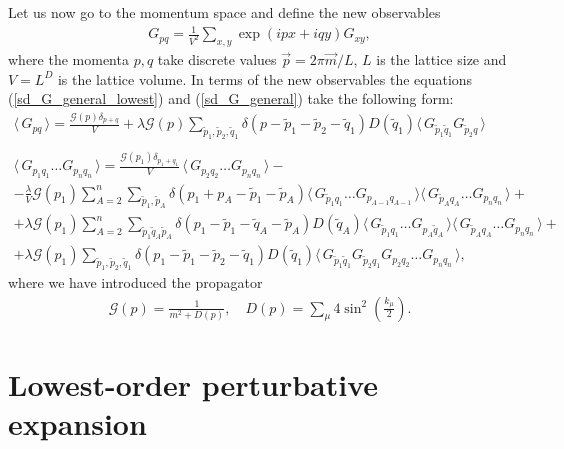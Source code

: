 \documentclass[twocolumn,showpacs,preprintnumbers,superscriptaddress,amsmath,floatfix,amssymb,secnumarabic]{revtex4}
\newcommand{\G}{\mathcal{G}}
\newcommand{\lr}[1]{ \left( #1 \right) }
\newcommand{\vev}[1]{ \langle \, #1 \, \rangle }
\newcommand{\expa}[1]{ \exp{\left( #1 \right)} }
\begin{document}
\begin{widetext}
Let us now go to the momentum space and define the new observables
\begin{eqnarray}
\label{momentum_space_observables}
 G_{p q} = \frac{1}{V^2} \sum\limits_{x, y} \expa{i p x + i q y} G_{x y},
\end{eqnarray}
where the momenta $p, q$ take discrete values $\vec{p} = 2 \pi \vec{m}/L$, $L$ is the lattice size and $V = L^D$ is the lattice volume. In terms of the new observables the equations (\ref{sd_G_general_lowest}) and (\ref{sd_G_general}) take the following form:
\begin{eqnarray}
\label{sd_G_general_fourier_lowest}
 \vev{G_{p q}} = \frac{\G\lr{p} \delta_{p+q}}{V} +
 \lambda \G\lr{p} \sum\limits_{\tilde{p}_1, \tilde{p}_2, \tilde{q}_1}
 \delta\lr{p - \tilde{p}_1 - \tilde{p}_2 - \tilde{q}_1} D\lr{\tilde{q}_1} \vev{G_{\tilde{p}_1 \tilde{q}_1} G_{\tilde{p}_2 q}}
 \\{}\nonumber\\
\label{sd_G_general_fourier}
 \vev{ G_{p_1 q_1} \ldots G_{p_n q_n} }
 =
  \frac{\G\lr{p_1} \delta_{p_1 + q_1}}{V} \, \vev{G_{p_2 q_2} \ldots G_{p_n q_n}}
 - \nonumber \\ -
 \frac{\lambda}{V} \G\lr{p_1} \sum\limits_{A=2}^{n} \sum\limits_{\tilde{p}_1, \tilde{p}_A} \delta\lr{p_1 + p_A - \tilde{p}_1 - \tilde{p}_A} \vev{G_{\tilde{p}_1 q_1} \ldots G_{p_{A-1} q_{A-1}}} \vev{G_{\tilde{p}_A q_A} \ldots G_{p_n q_n}}
 + \nonumber \\ +
 \lambda \G\lr{p_1} \sum\limits_{A=2}^{n}
 \sum\limits_{\tilde{p}_1 \tilde{q}_A \tilde{p}_A}
 \delta\lr{p_1 - \tilde{p}_1 - \tilde{q}_A - \tilde{p}_A}
 D\lr{\tilde{q}_A}
 \vev{G_{\tilde{p}_1 q_1} \ldots G_{p_{A} \tilde{q}_A}} \vev{G_{\tilde{p}_A q_A} \ldots G_{p_n q_n}}
 + \nonumber \\ +
 \lambda \G\lr{p_1} \sum\limits_{\tilde{p}_1, \tilde{p}_2, \tilde{q}_1}
 \delta\lr{p_1 - \tilde{p}_1 - \tilde{p}_2 - \tilde{q}_1} D\lr{\tilde{q}_1} \vev{G_{\tilde{p}_1 \tilde{q}_1} G_{\tilde{p}_2 q_1} G_{p_2 q_2} \ldots G_{p_n q_n}} ,
\end{eqnarray}
where we have introduced the propagator
\begin{eqnarray}
 \G\lr{p} = \frac{1}{m^2 + D\lr{p}},
 \quad
 D\lr{p} = \sum\limits_{\mu} 4 \sin^2\lr{\frac{k_{\mu}}{2}} .
\end{eqnarray}
\end{widetext}

\section*{Lowest-order perturbative expansion}
\end{document}
